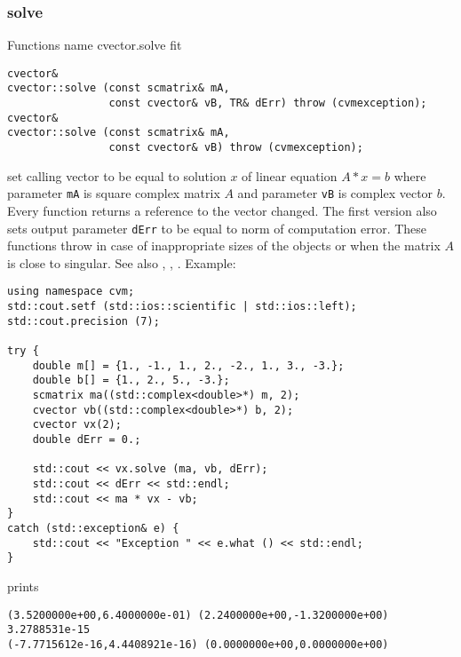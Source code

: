 \subsubsection{solve}
Functions%
\pdfdest name {cvector.solve} fit
\begin{verbatim}
cvector&
cvector::solve (const scmatrix& mA,
                const cvector& vB, TR& dErr) throw (cvmexception);
cvector&
cvector::solve (const scmatrix& mA,
                const cvector& vB) throw (cvmexception);
\end{verbatim}
set  calling vector to be equal to  solution $x$ of linear equation
$A*x=b$ where parameter \verb"mA" is  square complex matrix $A$
and parameter \verb"vB" is  complex vector $b$.
Every function returns a reference to the vector changed.
The first version also sets output parameter \verb"dErr" to be equal
to  norm of computation error.
These functions throw 
in case of inappropriate sizes
of the objects or when the matrix $A$ is close to singular.
See also  , 
, .
Example:
\begin{Verbatim}
using namespace cvm;
std::cout.setf (std::ios::scientific | std::ios::left);
std::cout.precision (7);

try {
    double m[] = {1., -1., 1., 2., -2., 1., 3., -3.};
    double b[] = {1., 2., 5., -3.};
    scmatrix ma((std::complex<double>*) m, 2);
    cvector vb((std::complex<double>*) b, 2);
    cvector vx(2);
    double dErr = 0.;

    std::cout << vx.solve (ma, vb, dErr);
    std::cout << dErr << std::endl;
    std::cout << ma * vx - vb;
}
catch (std::exception& e) {
    std::cout << "Exception " << e.what () << std::endl;
}
\end{Verbatim}
prints
\begin{Verbatim}
(3.5200000e+00,6.4000000e-01) (2.2400000e+00,-1.3200000e+00)
3.2788531e-15
(-7.7715612e-16,4.4408921e-16) (0.0000000e+00,0.0000000e+00)
\end{Verbatim}
\newpage




